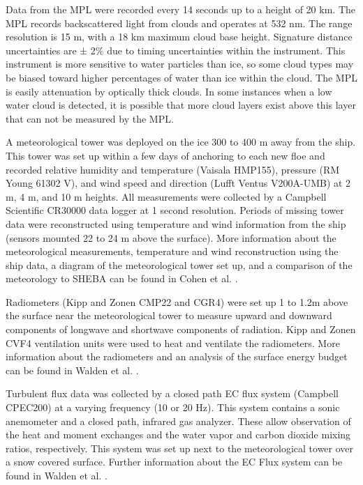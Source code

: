 Data from the MPL were recorded every 14 seconds up to a height of 20 km. The MPL records backscattered light from clouds and operates at 532 nm. The range resolution is 15 m, with a 18 km maximum cloud base height. Signature distance uncertainties are ± 2\% due to timing uncertainties within the instrument. This instrument is more sensitive to water particles than ice, so some cloud types may be biased toward higher percentages of water than ice within the cloud. The MPL is easily attenuation by optically thick clouds. In some instances when a low water cloud is detected, it is possible that more cloud layers exist above this layer that can not be measured by the MPL. 

A meteorological tower was deployed on the ice 300 to 400 m away from the ship. This tower was set up within a few days of anchoring to each new floe and recorded relative humidity and temperature (Vaisala HMP155), pressure (RM Young 61302 V), and wind speed and direction (Lufft Ventus V200A-UMB) at 2 m, 4 m, and 10 m heights. All measurements were collected by a Campbell Scientific CR30000 data logger at 1 second resolution. Periods of missing tower data were reconstructed using temperature and wind information from the ship (sensors mounted 22 to 24 m above the surface). More information about the meteorological measurements, temperature and wind reconstruction using the ship data, a diagram of the meteorological tower set up, and a comparison of the meteorology to SHEBA can be found in Cohen et al. \cite{cohen:2017}.

Radiometers (Kipp and Zonen CMP22 and CGR4) were set up 1 to 1.2m above the surface near the meteorological tower to measure upward and downward components of longwave and shortwave components of radiation. Kipp and Zonen CVF4 ventilation units were used to heat and ventilate the radiometers. More information about the radiometers and an analysis of the surface energy budget can be found in Walden et al. \cite{walden:2017}.

Turbulent flux data was collected by a closed path EC flux system (Campbell CPEC200) at a varying frequency (10 or 20 Hz). This system contains a sonic anemometer and a closed path, infrared gas analyzer. These allow observation of the heat and moment exchanges and the water vapor and carbon dioxide mixing ratios, respectively. This system was set up next to the meteorological tower over a snow covered surface. Further information about the EC Flux system can be found in Walden et al. \cite{walden:2017}.

